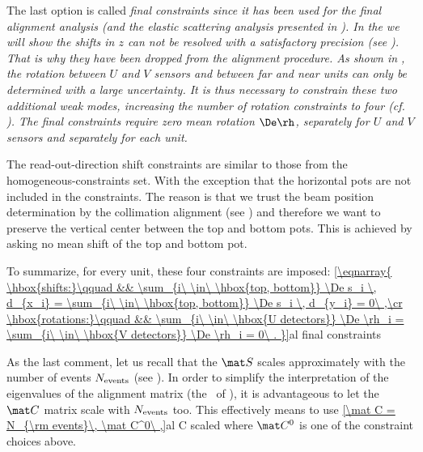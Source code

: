 \> The last option is called \em{final constraints} since it has been used for the final alignment analysis (and the elastic scattering analysis presented in ). In the  we will show the shifts in $z$ can not be resolved with a satisfactory precision (see ). That is why they have been dropped from the alignment procedure. As shown in , the rotation between $U$ and $V$ sensors and between far and near units can only be determined with a large uncertainty. It is thus necessary to constrain these two additional weak modes, increasing the number of rotation constraints to four (cf. ). The final constraints require zero mean rotation $\De\rh$, separately for $U$ and $V$ sensors and separately for each unit.
\par\parindent\itindent\indent\hang
The read-out-direction shift constraints are similar to those from the homogeneous-constraints set. With the exception that the horizontal pots are not included in the constraints. The reason is that we trust the beam position determination by the collimation alignment (see ) and therefore we want to preserve the vertical center between the top and bottom pots. This is achieved by asking no mean shift of the top and bottom pot.
\par\parindent\itindent\indent\hang
To summarize, for every unit, these four constraints are imposed:
\eqref{\eqnarray{
\hbox{shifts:}\qquad && \sum_{i\ \in\ \hbox{top, bottom}} \De s_i \, d_{x_i} = \sum_{i\ \in\ \hbox{top, bottom}} \De s_i \, d_{y_i} = 0\ ,\cr
\hbox{rotations:}\qquad && \sum_{i\ \in\ \hbox{U detectors}} \De \rh_i = \sum_{i\ \in\ \hbox{V detectors}} \De \rh_i = 0\ .
}}{al final constraints}

\iffalse
\eqref{
	C = \pmatrix{
		\vdots	&\vdots	&		&		& \cr
		d_{ix}	&d_{iy}	&		&		& \cr
		\vdots	&\vdots	&		&		& \cr
				&		&\vdots	&\vdots	& \cr
				&		&d_{ix}	&d_{iy}	& \cr
				&		&\vdots	&\vdots	& \cr\ln
				&		&		&		&1		&0		& 		& 	\cr
				&		&		&		&0		&1		& 		& 	\cr
				&		&		&		&1		&0		& 		& 	\cr
				&		&		&		&0		&1		& 		& 	\cr
				&		&		&		&\vdots	&\vdots	& 		& 	\cr
				&		&		&		&		&		&1		&0		\cr
				&		&		&		&		&		&0		&1		\cr
				&		&		&		&		&		&1		&0		\cr
				&		&		&		&		&		&0		&1		\cr
				&		&		&		&		&		&\vdots	&\vdots	\cr
	}
}{al final cnst ex}
\fi

As the last comment, let us recall that the $\mat S$ scales approximately with the number of events $N_{\rm events}$ (see ). In order to simplify the interpretation of the eigenvalues of the alignment matrix (the \lhs~of ), it is advantageous to let the $\mat C$ matrix scale with $N_{\rm events}$ too. This effectively means to use
\eqref{\mat C = N_{\rm events}\, \mat C^0\ ,}{al C scaled}
where $\mat C^0$ is one of the constraint choices above.


